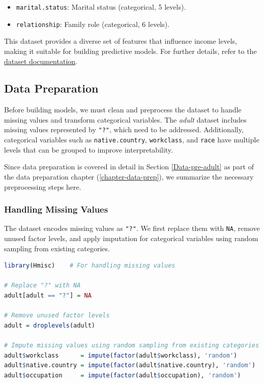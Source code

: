 \documentclass[
  11pt,
]{book}
\newcommand{\passthrough}[1]{#1}
\providecommand{\tightlist}{%
  \setlength{\itemsep}{0pt}\setlength{\parskip}{0pt}}
\theoremstyle{definition}
\theoremstyle{definition}
\theoremstyle{definition}
\theoremstyle{definition}
\theoremstyle{remark}
\begin{document}
\begin{itemize}
  \begin{itemize}
  \tightlist
  \item
    \passthrough{\lstinline!marital.status!}: Marital status (categorical, 5 levels).\\
  \item
    \passthrough{\lstinline!relationship!}: Family role (categorical, 6 levels).
  \end{itemize}
\end{itemize}

This dataset provides a diverse set of features that influence income levels, making it suitable for building predictive models. For further details, refer to the \href{https://www.rdocumentation.org/packages/liver/versions/1.3/topics/adult}{dataset documentation}.

\subsection*{Data Preparation}\label{data-preparation-3}


Before building models, we must clean and preprocess the dataset to handle missing values and transform categorical variables. The \emph{adult} dataset includes missing values represented by \passthrough{\lstinline!"?"!}, which need to be addressed. Additionally, categorical variables such as \passthrough{\lstinline!native.country!}, \passthrough{\lstinline!workclass!}, and \passthrough{\lstinline!race!} have multiple levels that can be grouped to improve interpretability.

Since data preparation is covered in detail in Section \ref{Data-pre-adult} as part of the data preparation chapter (\ref{chapter-data-prep}), we summarize the necessary preprocessing steps here.

\subsubsection*{Handling Missing Values}\label{handling-missing-values}


The dataset encodes missing values as \passthrough{\lstinline!"?"!}. We first replace them with \passthrough{\lstinline!NA!}, remove unused factor levels, and apply imputation for categorical variables using random sampling from existing categories.

\begin{lstlisting}[language=R]
library(Hmisc)    # For handling missing values

# Replace "?" with NA
adult[adult == "?"] = NA

# Remove unused factor levels
adult = droplevels(adult)

# Impute missing values using random sampling from existing categories
adult$workclass      = impute(factor(adult$workclass), 'random')
adult$native.country = impute(factor(adult$native.country), 'random')
adult$occupation     = impute(factor(adult$occupation), 'random')
\end{lstlisting}
\end{document}
